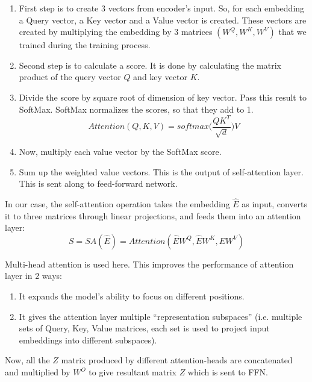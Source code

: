 \documentclass[11pt]{article}
\begin{document}
	\begin{enumerate}
	\item First step is to create 3 vectors from encoder’s input. So, for each embedding a Query vector, a Key vector and a Value vector is created. These vectors are created by multiplying the embedding by 3 matrices $(W^{Q},W^{K},W^{V})$ that we trained during the training process.
	\item Second step is to calculate a score. It is done by calculating the matrix  product of the query vector $Q$ and key vector $K$.
	\item Divide the score by square root of dimension of key vector. Pass this result to SoftMax. SoftMax normalizes the scores, so that they add to 1.
	\[Attention (Q,K,V) = softmax\Bigg(\frac{QK^{T}}{\sqrt{d}}\Bigg)V\]

	\item Now, multiply each value vector by the SoftMax score.
	\item Sum up the weighted value vectors. This is the output of self-attention layer. This is sent along to feed-forward network.
	
	\end{enumerate}
	In our case, the self-attention operation takes
the embedding $\hat E$ as input, converts it to three matrices through
linear projections, and feeds them into an attention layer:
	\[ S = SA(\hat{E}) = Attention(\hat{E}W^{Q},\hat{E}W^{K},\hat{E}W^{V})  \]

Multi-head attention is used here. This improves the performance of attention layer in 2 ways:
\begin{enumerate}
	\item It expands the model’s ability to focus on different positions.
	\item It gives the attention layer multiple “representation subspaces” (i.e. multiple sets of Query, Key, Value matrices, each set is used to project input embeddings into different subspaces). 
\end{enumerate}
Now, all the $Z$ matrix produced by different attention-heads are concatenated and multiplied by $W^{O}$ to give resultant matrix $Z$ which is sent to FFN.
\end{document}
